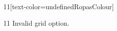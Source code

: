 \documentclass[paper=A4]{ropas-poster}
\begin{document}
\begin{postergrid}{1}{1}[text-color=undefinedRopasColour]
\begin{posterblock}{1}{1}
Invalid grid option.
\end{posterblock}
\end{postergrid}
\end{document}
